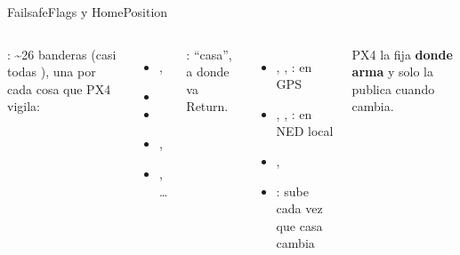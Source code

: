 \begin{frame}{FailsafeFlags y HomePosition}
  \begin{columns}[t]
    \small
    \textbf{}: \textasciitilde26 banderas (casi todas ), una por cada cosa que PX4 vigila:
    \begin{itemize}\scriptsize
      \item {}, 
      \item {}
      \item {}
      \item {}, 
      \item {}, \ldots
    \end{itemize}
    \small
    \textbf{}: ``casa'', a donde va Return.
    \begin{itemize}\scriptsize
      \item {}, , : en GPS
      \item {}, , : en NED local
      \item {}, 
      \item {}: sube cada vez que casa cambia
    \end{itemize}
    PX4 la fija \textbf{donde arma} y solo la publica cuando cambia.
  \end{columns}
\end{frame}

